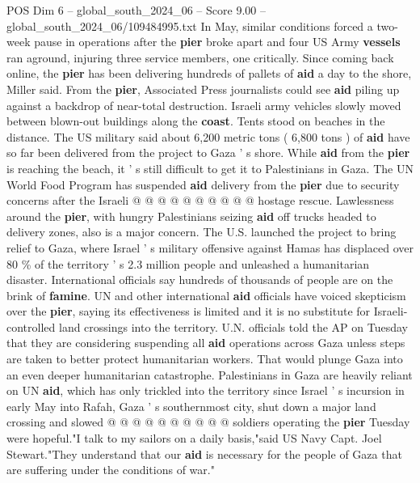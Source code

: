 \begin{textsample}{POS Dim 6 – global\_south\_2024\_06 – Score 9.00 – global\_south\_2024\_06/109484995.txt}
In May, similar conditions forced a two-week pause in operations after the \textbf{pier} broke apart and four US Army \textbf{vessels} ran aground, injuring three service members, one critically.
Since coming back online, the \textbf{pier} has been delivering hundreds of pallets of \textbf{aid} a day to the shore, Miller said.
From the \textbf{pier}, Associated Press journalists could see \textbf{aid} piling up against a backdrop of near-total destruction.
Israeli army vehicles slowly moved between blown-out buildings along the \textbf{coast}.
Tents stood on beaches in the distance.
The US military said about 6,200 metric tons ( 6,800 tons ) of \textbf{aid} have so far been delivered from the project to Gaza ' s shore.
While \textbf{aid} from the \textbf{pier} is reaching the beach, it ' s still difficult to get it to Palestinians in Gaza.
The UN World Food Program has suspended \textbf{aid} delivery from the \textbf{pier} due to security concerns after the Israeli @ @ @ @ @ @ @ @ @ @ hostage rescue.
Lawlessness around the \textbf{pier}, with hungry Palestinians seizing \textbf{aid} off trucks headed to delivery zones, also is a major concern.
The U.S. launched the project to bring relief to Gaza, where Israel ' s military offensive against Hamas has displaced over 80 \% of the territory ' s 2.3 million people and unleashed a humanitarian disaster.
International officials say hundreds of thousands of people are on the brink of \textbf{famine}.
UN and other international \textbf{aid} officials have voiced skepticism over the \textbf{pier}, saying its effectiveness is limited and it is no substitute for Israeli-controlled land crossings into the territory.
U.N. officials told the AP on Tuesday that they are considering suspending all \textbf{aid} operations across Gaza unless steps are taken to better protect humanitarian workers.
That would plunge Gaza into an even deeper humanitarian catastrophe.
Palestinians in Gaza are heavily reliant on UN \textbf{aid}, which has only trickled into the territory since Israel ' s incursion in early May into Rafah, Gaza ' s southernmost city, shut down a major land crossing and slowed @ @ @ @ @ @ @ @ @ @ soldiers operating the \textbf{pier} Tuesday were hopeful."I talk to my sailors on a daily basis,"said US Navy Capt.
Joel Stewart."They understand that our \textbf{aid} is necessary for the people of Gaza that are suffering under the conditions of war."

\end{textsample}
